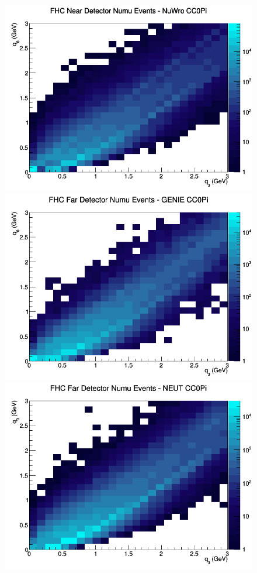 \begin{figure}[h]
\includegraphics[width=\linewidth]{eff_q0_q3/FGT/CC0Pi_FHC_ND_numu_q3_q0_NuWro.png}
\endminipage
\newline
{}
\includegraphics[width=\linewidth]{eff_q0_q3/FGT/CC0Pi_FHC_FD_numu_q3_q0_GENIE.png}
\endminipage
{}
\includegraphics[width=\linewidth]{eff_q0_q3/FGT/CC0Pi_FHC_FD_numu_q3_q0_NEUT.png}

\end{figure}
